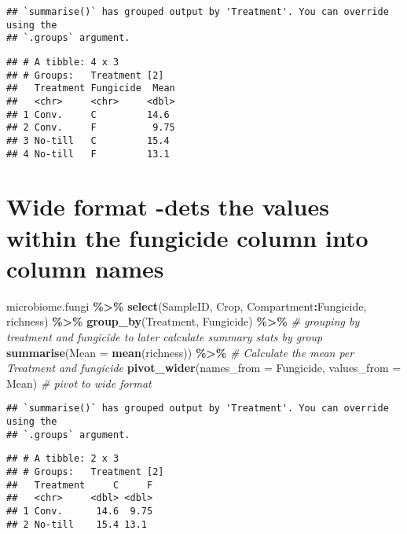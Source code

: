 \documentclass[
]{article}
\newenvironment{Shaded}{\begin{snugshade}}{\end{snugshade}}
\newcommand{\AttributeTok}[1]{\textcolor[rgb]{0.13,0.29,0.53}{#1}}
\newcommand{\CommentTok}[1]{\textcolor[rgb]{0.56,0.35,0.01}{\textit{#1}}}
\newcommand{\FunctionTok}[1]{\textcolor[rgb]{0.13,0.29,0.53}{\textbf{#1}}}
\newcommand{\NormalTok}[1]{#1}
\newcommand{\SpecialCharTok}[1]{\textcolor[rgb]{0.81,0.36,0.00}{\textbf{#1}}}
\begin{document}
\begin{verbatim}
## `summarise()` has grouped output by 'Treatment'. You can override using the
## `.groups` argument.
\end{verbatim}

\begin{verbatim}
## # A tibble: 4 x 3
## # Groups:   Treatment [2]
##   Treatment Fungicide  Mean
##   <chr>     <chr>     <dbl>
## 1 Conv.     C         14.6 
## 2 Conv.     F          9.75
## 3 No-till   C         15.4 
## 4 No-till   F         13.1
\end{verbatim}

\section{Wide format -dets the values within the fungicide column into
column
names}\label{wide-format--dets-the-values-within-the-fungicide-column-into-column-names}

\begin{Shaded}
\begin{Highlighting}[]
\NormalTok{microbiome.fungi }\SpecialCharTok{\%\textgreater{}\%}
  \FunctionTok{select}\NormalTok{(SampleID, Crop, Compartment}\SpecialCharTok{:}\NormalTok{Fungicide, richness) }\SpecialCharTok{\%\textgreater{}\%}
   \FunctionTok{group\_by}\NormalTok{(Treatment, Fungicide) }\SpecialCharTok{\%\textgreater{}\%}  \CommentTok{\# grouping by treatment and fungicide to later calculate summary stats by group}
  \FunctionTok{summarise}\NormalTok{(}\AttributeTok{Mean =} \FunctionTok{mean}\NormalTok{(richness)) }\SpecialCharTok{\%\textgreater{}\%}  \CommentTok{\# Calculate the mean per Treatment and fungicide}
  \FunctionTok{pivot\_wider}\NormalTok{(}\AttributeTok{names\_from =}\NormalTok{ Fungicide, }\AttributeTok{values\_from =}\NormalTok{ Mean) }\CommentTok{\# pivot to wide format}
\end{Highlighting}
\end{Shaded}

\begin{verbatim}
## `summarise()` has grouped output by 'Treatment'. You can override using the
## `.groups` argument.
\end{verbatim}

\begin{verbatim}
## # A tibble: 2 x 3
## # Groups:   Treatment [2]
##   Treatment     C     F
##   <chr>     <dbl> <dbl>
## 1 Conv.      14.6  9.75
## 2 No-till    15.4 13.1
\end{verbatim}
\end{document}
